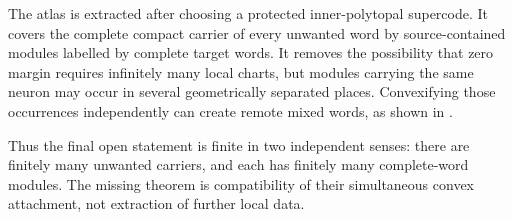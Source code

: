 The atlas is extracted after choosing a protected inner-polytopal supercode.  It covers the complete compact carrier of every unwanted word by source-contained modules labelled by complete target words.  It removes the possibility that zero margin requires infinitely many local charts, but modules carrying the same neuron may occur in several geometrically separated places.  Convexifying those occurrences independently can create remote mixed words, as shown in .

Thus the final open statement is finite in two independent senses: there are finitely many unwanted carriers, and each has finitely many complete-word modules.  The missing theorem is compatibility of their simultaneous convex attachment, not extraction of further local data.
